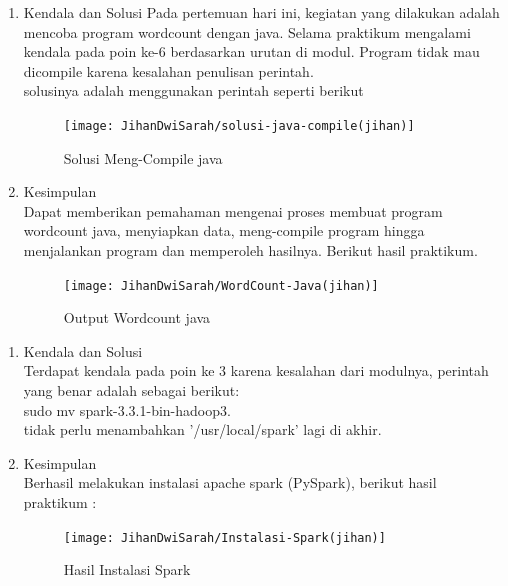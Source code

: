 \begin{enumerate}
\item Kendala dan Solusi 
Pada pertemuan hari ini, kegiatan yang dilakukan adalah mencoba program  wordcount dengan java. Selama praktikum mengalami kendala pada poin ke-6 berdasarkan urutan di modul. Program tidak mau dicompile karena kesalahan penulisan perintah.\\

solusinya adalah menggunakan perintah seperti berikut 
\begin{figure}[!ht]
\texttt{[image: JihanDwiSarah/solusi-java-compile(jihan)]}
\caption{Solusi Meng-Compile java}
\label{gam:solusi-java-compile(jihan)}
\end{figure}


\item Kesimpulan\\
Dapat memberikan pemahaman mengenai proses membuat program wordcount java, menyiapkan data, meng-compile program hingga menjalankan program dan memperoleh hasilnya. Berikut hasil praktikum.

\begin{figure}[!ht]
\texttt{[image: JihanDwiSarah/WordCount-Java(jihan)]}
\caption{Output Wordcount java}
\label{gam:WordCount-Java(jihan)}
\end{figure}
\end{enumerate}

\begin{enumerate}
\item Kendala dan Solusi \\
Terdapat kendala pada poin ke 3 karena kesalahan dari modulnya, perintah yang benar adalah sebagai berikut:\\
sudo mv spark-3.3.1-bin-hadoop3.\\
tidak perlu menambahkan '/usr/local/spark' lagi di akhir.


\item Kesimpulan\\
Berhasil melakukan instalasi apache spark (PySpark), berikut hasil praktikum : \\

\begin{figure}[!ht]
\texttt{[image: JihanDwiSarah/Instalasi-Spark(jihan)]}
\caption{Hasil Instalasi Spark}
\label{gam:Instalasi-Spark(jihan)}
\end{figure}


\end{enumerate}


